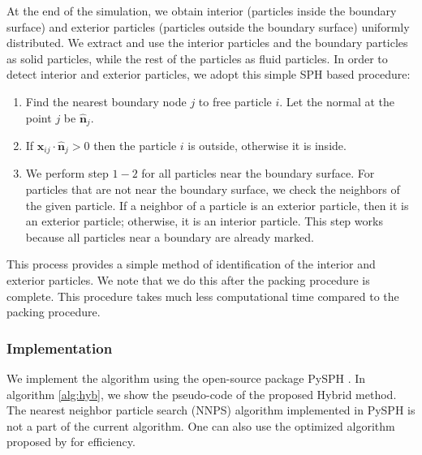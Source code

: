 \documentclass[preprint,12pt]{elsarticle}
\newcommand{\ten}[1]{\ensuremath{\mathbf{#1}}}
\begin{document}
At the end of the simulation, we obtain interior (particles inside the
boundary surface) and exterior particles (particles outside the boundary
surface) uniformly distributed. We extract and use the interior particles and the boundary particles as solid particles, while the rest of the
particles as fluid particles. In order to detect interior and exterior
particles, we adopt this simple SPH based procedure:
\begin{enumerate}[Step 1:]
\item Find the nearest boundary node $j$ to free particle $i$.  Let the normal
  at the point $j$ be $\hat{\ten{n}}_j$.

\item If $\ten{x}_{ij} \cdot \hat{\ten{n}}_j> 0$ then the particle $i$ is
  outside, otherwise it is inside.

\item We perform step $1-2$ for all particles near the boundary surface. For
particles that are not near the boundary surface, we check the neighbors of
the given particle. If a neighbor of a particle is an exterior particle, then
it is an exterior particle; otherwise, it is an interior particle. This step
works because all particles near a boundary are already marked.
\end{enumerate}
This process provides a simple method of identification of the interior and
exterior particles. We note that we do this after the packing procedure is
complete. This procedure takes much less computational time compared to the
packing procedure.

\subsubsection{Implementation}

We implement the algorithm using the open-source package PySPH
\cite{pysph2020}. In algorithm \ref{alg:hyb}, we show the pseudo-code of the
proposed Hybrid method. The nearest neighbor particle search (NNPS) algorithm
implemented in PySPH \cite{pysph2020} is not a part of the current algorithm.
One can also use the optimized algorithm proposed by
\citet{viccione_defining_2008} for efficiency.
\end{document}
